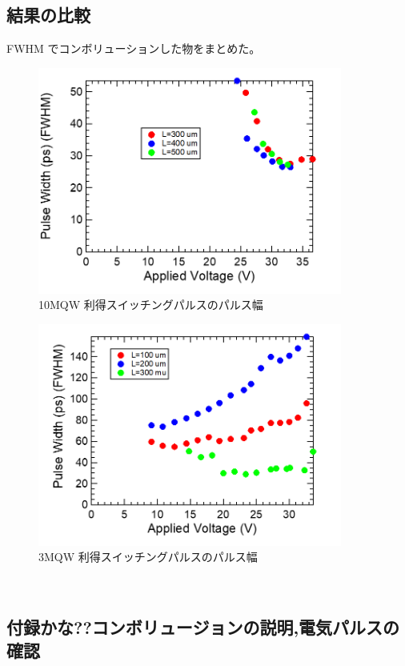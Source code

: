 \subsection{結果の比較}%
FWHM でコンボリューションした物をまとめた。
\begin{figure}[h]
	\centering
	\includegraphics[width=10cm]{figure/fig_3_2_10QW_ridge_GS_FWHM.png}
		\caption{10MQW 利得スイッチングパルスのパルス幅}
		\label{fig:fig_3_2_10QW_ridge_GS_FWHM}
\end{figure}

\begin{figure}[h]
	\centering
	\includegraphics[width=10cm]{figure/fig_3_2_3QW_ridge_GS_FWHM.png}
		\caption{3MQW 利得スイッチングパルスのパルス幅}
		\label{fig:fig_3_2_3QW_ridge_GS_FWHM}
\end{figure}
\clearpage　
\subsection{付録かな??コンボリュージョンの説明,電気パルスの確認}%

